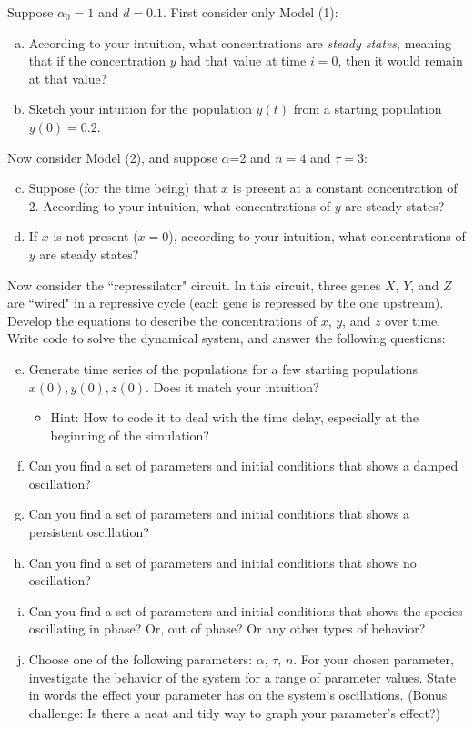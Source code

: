 \documentclass{exam}
\begin{document}
Suppose $\alpha_0=1$ and $d=0.1$. First consider only Model (1):
\begin{enumerate}[a.]
\item According to your intuition, what concentrations are \textit{steady states}, meaning that if the concentration $y$ had that value at time $i=0$, then it would remain at that value?
\item Sketch your intuition for the population $y(t)$ from a starting population $y(0)=0.2$. 
\end{enumerate}
Now consider Model (2), and suppose $\alpha$=2 and $n=4$ and $\tau=3$:
\begin{enumerate}[a.]
\setcounter{enumi}{2}
\item Suppose (for the time being) that $x$ is present at a constant concentration of 2. According to your intuition, what concentrations of $y$ are steady states?
\item If $x$ is not present ($x=0$), according to your intuition, what concentrations of $y$ are steady states?
\end{enumerate}
Now consider the ``repressilator" circuit. In this circuit, three genes $X$, $Y$, and $Z$ are ``wired" in a repressive cycle (each gene is repressed by the one upstream). Develop the equations to describe the concentrations of $x$, $y$, and $z$ over time. Write code to solve the dynamical system, and answer the following questions:
\begin{enumerate}[a.]
\setcounter{enumi}{4}
\item Generate time series of the populations for a few starting populations~$x(0), y(0), z(0)$. Does it match your intuition?
\begin{itemize}
\item Hint: How to code it to deal with the time delay, especially at the beginning of the simulation?
\end{itemize}
\item Can you find a set of parameters and initial conditions that shows a damped oscillation?
\item Can you find a set of parameters and initial conditions that shows a persistent oscillation?
\item Can you find a set of parameters and initial conditions that shows no oscillation?
\item Can you find a set of parameters and initial conditions that shows the species oscillating in phase? Or, out of phase? Or any other types of behavior?
\item Choose one of the following parameters: $\alpha$, $\tau$, $n$. For your chosen parameter, investigate the behavior of the system for a range of parameter values. State in words the effect your parameter has on the system's oscillations. (Bonus challenge: Is there a neat and tidy way to graph your parameter's effect?)
\end{enumerate}

  
\end{document}
